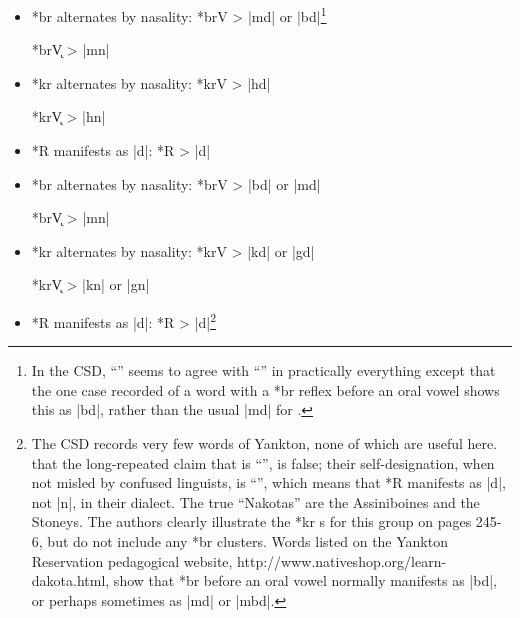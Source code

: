 \documentclass[output=paper]{LSP/langsci}
\begin{document}
\begin{itemize}
\item  *br alternates by nasality: \hspace{1em} *brV		>	|md| or |bd|\footnote{In the CSD, ``'' seems to agree with ``'' in practically everything except that the one case recorded of a  word with a *br reflex before an oral vowel shows this as |bd|, rather than the usual |md| for .}

\hspace{12em} *br\k{V}	>	|mn|

\item  *kr alternates by nasality:  \hspace{1.2em} *krV       >          |hd|

\hspace{12em} *kr\k{V}	>	|hn|

\item *R manifests as |d|: \hspace{4.5em} *R	>	|d|
\end{itemize}


\begin{itemize}
\item *br alternates by nasality: \hspace{1em} *brV	>	|bd| or |md|

\hspace{12em} *br\k{V} 	>	|mn|
\item  *kr alternates by nasality:  \hspace{1.2em} *krV       >          |kd| or |gd|

\hspace{12em} *kr\k{V} 	>	|kn| or |gn|

\item *R manifests as |d|: \hspace{4.5em} *R	>	|d|\footnote{The CSD records very few words of Yankton, none of which are useful here.  \citet{ParksDeMallie1992}  that the long-repeated claim that  is ``'', is false; their self-designation, when not misled by confused linguists, is ``'', which means that *R manifests as |d|, not |n|, in their dialect.  The true ``Nakotas'' are the Assiniboines and the Stoneys.  The authors clearly illustrate the *kr s for this group on pages 245-6, but do not include any *br clusters.  Words listed on the Yankton Reservation pedagogical website, http://www.nativeshop.org/learn-dakota.html, show that *br before an oral vowel normally manifests as |bd|, or perhaps sometimes as |md| or |mbd|.}
\end{itemize}
\end{document}
